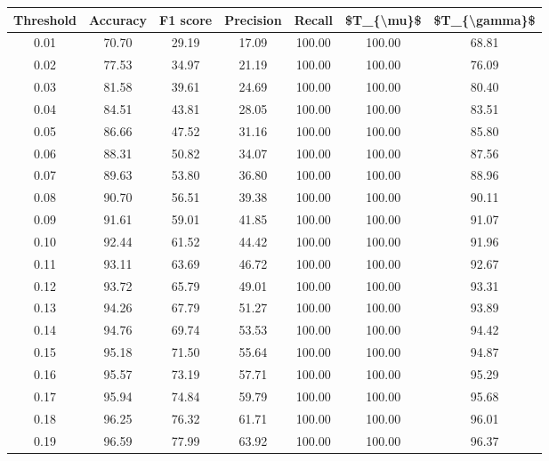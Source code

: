 \begin{tabular}{|c|c|c|c|c|c|c|}
\hline
 Threshold &  Accuracy &  F1 score &  Precision &  Recall &  \$T\_\{\textbackslash mu\}\$ &  \$T\_\{\textbackslash gamma\}\$ \\
\hline
      0.01 &     70.70 &     29.19 &      17.09 &  100.00 &     100.00 &         68.81 \\
      0.02 &     77.53 &     34.97 &      21.19 &  100.00 &     100.00 &         76.09 \\
      0.03 &     81.58 &     39.61 &      24.69 &  100.00 &     100.00 &         80.40 \\
      0.04 &     84.51 &     43.81 &      28.05 &  100.00 &     100.00 &         83.51 \\
      0.05 &     86.66 &     47.52 &      31.16 &  100.00 &     100.00 &         85.80 \\
      0.06 &     88.31 &     50.82 &      34.07 &  100.00 &     100.00 &         87.56 \\
      0.07 &     89.63 &     53.80 &      36.80 &  100.00 &     100.00 &         88.96 \\
      0.08 &     90.70 &     56.51 &      39.38 &  100.00 &     100.00 &         90.11 \\
      0.09 &     91.61 &     59.01 &      41.85 &  100.00 &     100.00 &         91.07 \\
      0.10 &     92.44 &     61.52 &      44.42 &  100.00 &     100.00 &         91.96 \\
      0.11 &     93.11 &     63.69 &      46.72 &  100.00 &     100.00 &         92.67 \\
      0.12 &     93.72 &     65.79 &      49.01 &  100.00 &     100.00 &         93.31 \\
      0.13 &     94.26 &     67.79 &      51.27 &  100.00 &     100.00 &         93.89 \\
      0.14 &     94.76 &     69.74 &      53.53 &  100.00 &     100.00 &         94.42 \\
      0.15 &     95.18 &     71.50 &      55.64 &  100.00 &     100.00 &         94.87 \\
      0.16 &     95.57 &     73.19 &      57.71 &  100.00 &     100.00 &         95.29 \\
      0.17 &     95.94 &     74.84 &      59.79 &  100.00 &     100.00 &         95.68 \\
      0.18 &     96.25 &     76.32 &      61.71 &  100.00 &     100.00 &         96.01 \\
      0.19 &     96.59 &     77.99 &      63.92 &  100.00 &     100.00 &         96.37 \\

\end{tabular}
